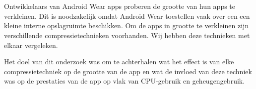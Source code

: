 




\chapter*{}

Ontwikkelaars van Android Wear apps proberen de grootte van hun apps te verkleinen. Dit is noodzakelijk omdat Android Wear toestellen vaak over een een kleine interne opslagruimte beschikken. Om de apps in grootte te verkleinen zijn verschillende compressietechnieken voorhanden. Wij hebben deze technieken met elkaar vergeleken. 

Het doel van dit onderzoek was om te achterhalen wat het effect is van elke compressietechniek op de grootte van de app en wat de invloed van deze techniek was op de prestaties van de app op vlak van CPU-gebruik en geheugengebruik. 

